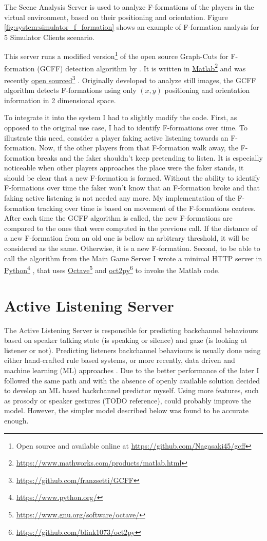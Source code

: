 \documentclass[]{simple-thesis}
\newcommand\fnurl[2]{%
  \href{#2}{#1}\footnote{\url{#2}}%
}
\begin{document}
The Scene Analysis Server is used to analyze F-formations of the players in the virtual environment, based on their positioning and orientation.
Figure \ref{fig:system:simulator_f_formation} shows an example of F-formation analysis for 5 Simulator Clients scenario.

This server runs a modified version\footnote{Open source and available online at \url{https://github.com/Nagasaki45/gcff}} of the open source Graph-Cuts for F-formation (GCFF) detection algorithm by \cite{Setti2015}.
It is written in \fnurl{Matlab}{https://www.mathworks.com/products/matlab.html} and was recently \fnurl{open sourced}{https://github.com/franzsetti/GCFF}.
Originally developed to analyze still images, the GCFF algorithm detects F-formations using only $(x, y)$ positioning and orientation information in 2 dimensional space.

To integrate it into the system I had to slightly modify the code.
First, as opposed to the original use case, I had to identify F-formations over time.
To illustrate this need, consider a player faking active listening towards an F-formation.
Now, if the other players from that F-formation walk away, the F-formation breaks and the faker shouldn't keep pretending to listen.
It is especially noticeable when other players approaches the place were the faker stands, it should be clear that a new F-formation is formed.
Without the ability to identify F-formations over time the faker won't know that an F-formation broke and that faking active listening is not needed any more.
My implementation of the F-formation tracking over time is based on movement of the F-formations centres.
After each time the GCFF algorithm is called, the new F-formations are compared to the ones that were computed in the previous call.
If the distance of a new F-formation from an old one is bellow an arbitrary threshold, it will be considered as the same.
Otherwise, it is a new F-formation.
Second, to be able to call the algorithm from the Main Game Server I wrote a minimal HTTP server in \fnurl{Python}{https://www.python.org/}, that uses \fnurl{Octave}{https://www.gnu.org/software/octave/} and \fnurl{oct2py}{https://github.com/blink1073/oct2py} to invoke the Matlab code.

\section{Active Listening Server}\label{system:active_listening_server}

The Active Listening Server is responsible for predicting backchannel behaviours based on speaker talking state (is speaking or silence) and gaze (is looking at listener or not).
Predicting listeners backchannel behaviours is usually done using either hand-crafted rule based systems, or more recently, data driven and machine learning (ML) approaches \citep{Morency2008}.
Due to the better performance of the later I followed the same path and with the absence of openly available solution decided to develop an ML based backchannel predictor myself.
Using more features, such as prosody \citep{Ward2000} or speaker gestures (TODO reference), could probably improve the model.
However, the simpler model described below was found to be accurate enough.
\end{document}
